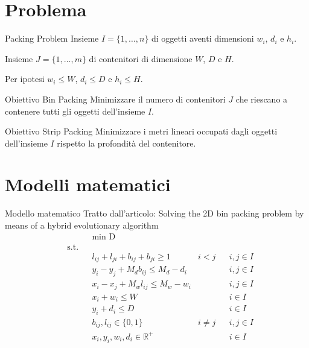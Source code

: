 \documentclass{beamer}
\begin{document}
\section{Problema}
\begin{frame}{Packing Problem}
	Insieme $I = \{1,\dots,n\}$ di oggetti aventi dimensioni $w_{i}$, $d_{i}$ e $h_{i}$.	
															
	Insieme $J = \{1,\dots,m\}$ di contenitori di dimensione $W$, $D$ e $H$.
													
	Per ipotesi $w_{i} \leq W$, $d_{i} \leq D$ e $h_{i} \leq H$.
	\vspace{.5em}
	\begin{minipage}[c]{0.45\textwidth}
		\begin{alertblock}{Obiettivo Bin Packing}
			Minimizzare il numero di contenitori $J$ che riescano a contenere tutti gli oggetti dell'insieme $I$.
		\end{alertblock}	
	\end{minipage}
	\hfill
	\begin{minipage}[c]{0.45\textwidth}
		\begin{alertblock}{Obiettivo Strip Packing}
			Minimizzare i metri lineari occupati dagli oggetti dell'insieme $I$ rispetto la profondit\`a del contenitore.
		\end{alertblock}	
	\end{minipage}
\end{frame}


\section{Modelli matematici}
\begin{frame}{Modello matematico}
	Tratto dall'articolo: Solving the 2D bin packing problem by means of a hybrid evolutionary algorithm
	\begin{align*}
		& & &\underset{}{\text{min D}} \\
		& \text{s.t.} \\
		  &   &   & l_{ij} + l_{ji} + b_{ij} + b_{ji} \geq 1      & i < j    &   & i,j \in I \\
		  &   &   & y_i - y_j + M_d b_{ij} \leq M_d - d_i         &          &   & i,j \in I \\
		  &   &   & x_i - x_j + M_w l_{ij} \leq M_w - w_i         &          &   & i,j \in I \\
		  &   &   & x_i + w_i \leq W                              &          &   & i \in I   \\
		  &   &   & y_i + d_i \leq D                              &          &   & i \in I   \\
		  &   &   & b_{ij}, l_{ij} \in \{0,1\}                    & i \neq j &   & i,j \in I \\
		  &   &   & x_{i}, y_{i}, w_{i}, d_{i} \in \mathbb{R}^{+} &          &   & i \in I   
	\end{align*}
\end{frame}
\end{document}
